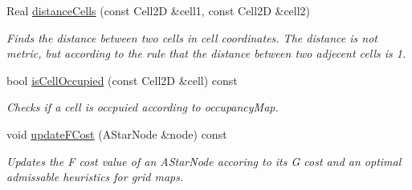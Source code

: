 \begin{DoxyCompactItemize}
Real \hyperlink{classSquirrelMotionPlanner_1_1Planner_acb7e51aef59c75deaa8ecb4881849334}{distance\-Cells} (const Cell2\-D \&cell1, const Cell2\-D \&cell2)
\begin{DoxyCompactList}\small\item\em Finds the distance between two cells in cell coordinates. The distance is not metric, but according to the rule that the distance between two adjecent cells is 1. \end{DoxyCompactList}\item 
bool \hyperlink{classSquirrelMotionPlanner_1_1Planner_a871d5a2cb60ea87eba1b6f1b61a4b5eb}{is\-Cell\-Occupied} (const Cell2\-D \&cell) const 
\begin{DoxyCompactList}\small\item\em Checks if a cell is occpuied according to occupancy\-Map. \end{DoxyCompactList}\item 
void \hyperlink{classSquirrelMotionPlanner_1_1Planner_aa88fa9332acb8f16edfb52c8fb57bb6f}{update\-F\-Cost} (A\-Star\-Node \&node) const 
\begin{DoxyCompactList}\small\item\em Updates the F cost value of an A\-Star\-Node accoring to its G cost and an optimal admissable heuristics for grid maps. \end{DoxyCompactList}\end{DoxyCompactItemize}
